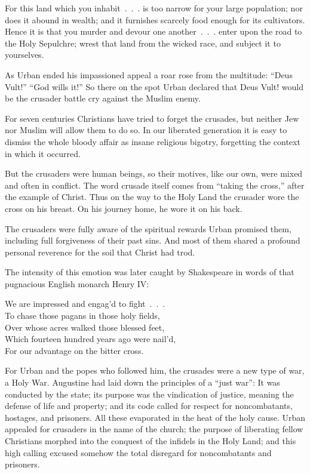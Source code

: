 \begin{blockquote}
For this land which you inhabit~.~.~. is too narrow for your large population; nor does it abound in
wealth; and it furnishes scarcely food enough for its cultivators. Hence it is that you murder and
devour one another~.~.~. enter upon the road to the Holy Sepulchre; wrest that land from the wicked
race, and subject it to yourselves.
\end{blockquote}

As Urban ended his impassioned appeal a roar rose from the multitude: “Deus Vult!” “God wills it!”
So there on the spot Urban declared that Deus Vult! would be the crusader battle cry against the
Muslim enemy.

For seven centuries Christians have tried to forget the crusades, but neither Jew nor Muslim will
allow them to do so. In our liberated generation it is easy to dismiss the whole bloody affair as
insane religious bigotry, forgetting the context in which it occurred.

But the crusaders were human beings, so their motives, like our own, were mixed and often in
conflict. The word crusade itself comes from “taking the cross,” after the example of Christ. Thus
on the way to the Holy Land the crusader wore the cross on his breast. On his journey home, he wore
it on his back.

The crusaders were fully aware of the spiritual rewards Urban promised them, including full
forgiveness of their past sins. And most of them shared a profound personal reverence for the soil
that Christ had trod.

The intensity of this emotion was later caught by Shakespeare in words of that pugnacious English
monarch Henry IV:

\begin{poem}
We are impressed and engag’d to fight~.~.~.\\
To chase those pagans in those holy fields,\\
Over whose acres walked those blessed feet,\\
Which fourteen hundred years ago were nail’d,\\
For our advantage on the bitter cross.
\end{poem}

For Urban and the popes who followed him, the crusades were a new type of war, a Holy War. Augustine
had laid down the principles of a “just war”: It was conducted by the state; its purpose was the
vindication of justice, meaning the defense of life and property; and its code called for respect
for noncombatants, hostages, and prisoners. All these evaporated in the heat of the holy cause.
Urban appealed for crusaders in the name of the church; the purpose of liberating fellow Christians
morphed into the conquest of the infidels in the Holy Land; and this high calling excused somehow
the total disregard for noncombatants and prisoners.

